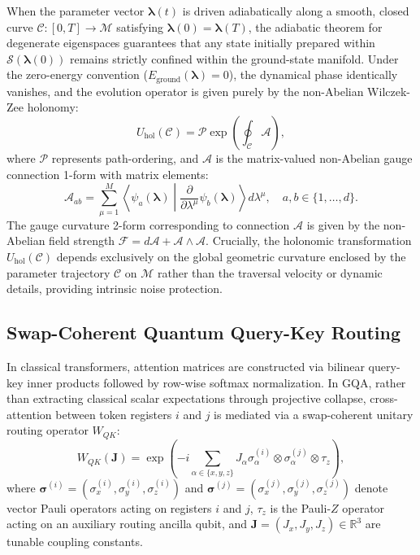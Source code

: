 \documentclass{article}
\begin{document}
When the parameter vector $\boldsymbol{\lambda}(t)$ is driven adiabatically along a smooth, closed curve $\mathcal{C}: [0, T] \to \mathcal{M}$ satisfying $\boldsymbol{\lambda}(0) = \boldsymbol{\lambda}(T)$, the adiabatic theorem for degenerate eigenspaces guarantees that any state initially prepared within $\mathcal{S}(\boldsymbol{\lambda}(0))$ remains strictly confined within the ground-state manifold. Under the zero-energy convention ($E_{\mathrm{ground}}(\boldsymbol{\lambda}) = 0$), the dynamical phase identically vanishes, and the evolution operator is given purely by the non-Abelian Wilczek-Zee holonomy:
\begin{equation}
U_{\mathrm{hol}}(\mathcal{C}) = \mathcal{P} \exp\left( \oint_{\mathcal{C}} \mathcal{A} \right),
\label{eq:wilczek_zee_holonomy}
\end{equation}
where $\mathcal{P}$ represents path-ordering, and $\mathcal{A}$ is the matrix-valued non-Abelian gauge connection 1-form with matrix elements:
\begin{equation}
\mathcal{A}_{ab} = \sum_{\mu=1}^M \left\langle \psi_a(\boldsymbol{\lambda}) \middle| \frac{\partial}{\partial \lambda^\mu} \psi_b(\boldsymbol{\lambda}) \right\rangle d\lambda^\mu, \quad a, b \in \{1, \dots, d\}.
\label{eq:gauge_connection}
\end{equation}
The gauge curvature 2-form corresponding to connection $\mathcal{A}$ is given by the non-Abelian field strength $\mathcal{F} = d\mathcal{A} + \mathcal{A} \wedge \mathcal{A}$. Crucially, the holonomic transformation $U_{\mathrm{hol}}(\mathcal{C})$ depends exclusively on the global geometric curvature enclosed by the parameter trajectory $\mathcal{C}$ on $\mathcal{M}$ rather than the traversal velocity or dynamic details, providing intrinsic noise protection.

\subsection{Swap-Coherent Quantum Query-Key Routing}
\label{sec:swap_coherent_routing}

In classical transformers, attention matrices are constructed via bilinear query-key inner products followed by row-wise softmax normalization. In GQA, rather than extracting classical scalar expectations through projective collapse, cross-attention between token registers $i$ and $j$ is mediated via a swap-coherent unitary routing operator $W_{QK}$:
\begin{equation}
W_{QK}(\boldsymbol{J}) = \exp\left( -i \sum_{\alpha \in \{x, y, z\}} J_\alpha \sigma_\alpha^{(i)} \otimes \sigma_\alpha^{(j)} \otimes \tau_z \right),
\label{eq:wqk_unitary}
\end{equation}
where $\boldsymbol{\sigma}^{(i)} = (\sigma_x^{(i)}, \sigma_y^{(i)}, \sigma_z^{(i)})$ and $\boldsymbol{\sigma}^{(j)} = (\sigma_x^{(j)}, \sigma_y^{(j)}, \sigma_z^{(j)})$ denote vector Pauli operators acting on registers $i$ and $j$, $\tau_z$ is the Pauli-$Z$ operator acting on an auxiliary routing ancilla qubit, and $\boldsymbol{J} = (J_x, J_y, J_z) \in \mathbb{R}^3$ are tunable coupling constants.
\end{document}
